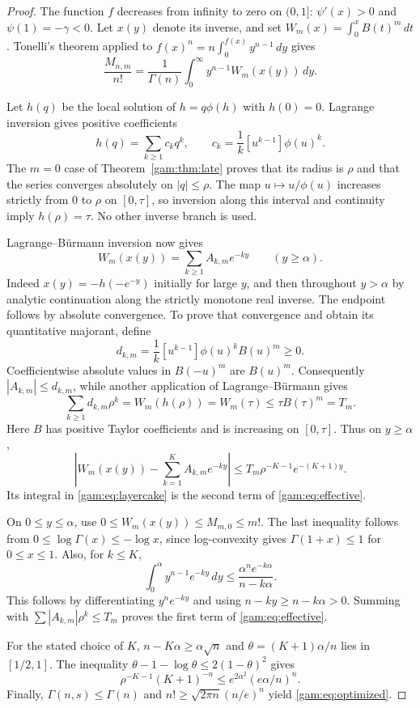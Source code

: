 \begin{proof}
The function $f$ decreases from infinity to zero on $(0,1]$:
$\psi'(x)>0$ and $\psi(1)=-\gamma<0$.  Let $x(y)$ denote its inverse,
and set $W_m(x)=\int_0^x B(t)^m\,dt$.  Tonelli's theorem applied to
$f(x)^n=n\int_0^{f(x)}y^{n-1}\,dy$ gives
\begin{equation}\label{gam:eq:layercake}
 \frac{M_{n,m}}{n!}
 =\frac1{\Gamma(n)}\int_0^\infty y^{n-1}W_m(x(y))\,dy.
\end{equation}

Let $h(q)$ be the local solution of $h=q\phi(h)$ with $h(0)=0$.
Lagrange inversion gives positive coefficients
\[
 h(q)=\sum_{k\ge1}c_kq^k,
 \qquad c_k=\frac1k[u^{k-1}]\phi(u)^k.
\]
The $m=0$ case of Theorem~\ref{gam:thm:late} proves that its radius
is $\rho$ and that the series converges absolutely on $|q|\le\rho$.
The map $u\mapsto u/\phi(u)$ increases strictly from $0$ to $\rho$
on $[0,\tau]$, so inversion along this interval and continuity imply
$h(\rho)=\tau$.  No other inverse branch is used.

Lagrange--B\"urmann inversion now gives
\[
 W_m(x(y))=\sum_{k\ge1}A_{k,m}e^{-ky}
 \qquad(y\ge\alpha).
\]
Indeed $x(y)=-h(-e^{-y})$ initially for large $y$, and then throughout
$y>\alpha$ by analytic continuation along the strictly monotone real
inverse.  The endpoint follows by absolute convergence.  To prove that
convergence and obtain its quantitative majorant, define
\[
 d_{k,m}=\frac1k[u^{k-1}]\phi(u)^k B(u)^m\ge0.
\]
Coefficientwise absolute values in $B(-u)^m$ are $B(u)^m$.
Consequently $|A_{k,m}|\le d_{k,m}$, while another application of
Lagrange--B\"urmann gives
\[
 \sum_{k\ge1}d_{k,m}\rho^k=W_m(h(\rho))=W_m(\tau)
 \le\tau B(\tau)^m=T_m.
\]
Here $B$ has positive Taylor coefficients and is increasing on $[0,\tau]$.
Thus on $y\ge\alpha$,
\[
 \left|W_m(x(y))-\sum_{k=1}^K A_{k,m}e^{-ky}\right|
 \le T_m\rho^{-K-1}e^{-(K+1)y}.
\]
Its integral in \eqref{gam:eq:layercake} is the second term of
\eqref{gam:eq:effective}.

On $0\le y\le\alpha$, use $0\le W_m(x(y))\le M_{m,0}\le m!$.
The last inequality follows from
$0\le\log\Gamma(x)\le-\log x$, since log-convexity gives
$\Gamma(1+x)\le1$ for $0\le x\le1$.  Also, for $k\le K$,
\[
 \int_0^\alpha y^{n-1}e^{-ky}\,dy
 \le\frac{\alpha^n e^{-k\alpha}}{n-k\alpha}.
\]
This follows by differentiating $y^ne^{-ky}$ and using
$n-ky\ge n-k\alpha>0$.  Summing with
$\sum|A_{k,m}|\rho^k\le T_m$ proves the first term of
\eqref{gam:eq:effective}.

For the stated choice of $K$, $n-K\alpha\ge\alpha\sqrt n$ and
$\theta=(K+1)\alpha/n$ lies in $[1/2,1]$.
The inequality $\theta-1-\log\theta\le2(1-\theta)^2$ gives
\[
 \rho^{-K-1}(K+1)^{-n}
 \le e^{2\alpha^2}(e\alpha/n)^n.
\]
Finally, $\Gamma(n,s)\le\Gamma(n)$ and
$n!\ge\sqrt{2\pi n}(n/e)^n$ yield \eqref{gam:eq:optimized}.
\end{proof}

